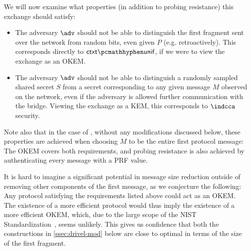 We will now examine what properties (in addition to probing resistance) this exchange should satisfy:
\begin{itemize}
    \item The adversary $\adv$ should not be able to distinguish the first fragment sent over the network from random bits, even given $P$ (e.g. retroactively). This corresponds directly to $\ctxtunif$, if we were to view the exchange as an OKEM.

    \item The adversary $\adv$ should not be able to distinguish a randomly sampled shared secret $S$ from a secret corresponding to any given message $M$ observed on the network, even if the adversary is allowed further communication with the bridge. Viewing the exchange as a KEM, this corresponds to $\indcca$ security.
    
\end{itemize}

Note also that in the case of \drivel{}, without any modifications discussed below, these properties are achieved when choosing $M$ to be the entire first protocol message:
The OKEM covers both requirements, and probing resistance is also achieved by authenticating every message with a PRF value.

It is hard to imagine a significant potential in message size reduction outside of removing other components of the first \drivel{} message, as we conjecture the following:
Any protocol satisfying the requirements listed above could act as an OKEM.
The existence of a more efficient protocol would thus imply the existence of a more efficient OKEM, which, due to the large scope of the NIST Standardization~\cite{nist-standardization}, seems unlikely.
This gives us confidence that both the constructions in \cref{ssec:drivel-mod} below are close to optimal in terms of the size of the first fragment.

